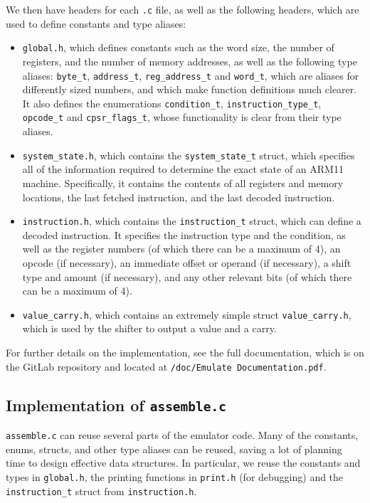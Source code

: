 \documentclass[10pt]{article}
\begin{document}
We then have headers for each \texttt{.c} file, as well as the following headers, which are used to define constants and type aliases:

\begin{itemize}
\item \texttt{global.h}, which defines constants such as the word size, the number of registers, and the number of memory addresses, as well as the following type aliases: \texttt{byte\_t}, \texttt{address\_t}, \texttt{reg\_address\_t} and \texttt{word\_t}, which are aliases for differently sized numbers, and which make function definitions much clearer. It also defines the enumerations \texttt{condition\_t}, \texttt{instruction\_type\_t}, \texttt{opcode\_t} and \texttt{cpsr\_flags\_t}, whose functionality is clear from their type aliases.
\item \texttt{system\_state.h}, which contains the \texttt{system\_state\_t} struct, which specifies all of the information required to determine the exact state of an ARM11 machine. Specifically, it contains the contents of all registers and memory locations, the last fetched instruction, and the last decoded instruction.
\item \texttt{instruction.h}, which contains the \texttt{instruction\_t} struct, which can define a decoded instruction. It specifies the instruction type and the condition, as well as the register numbers (of which there can be a maximum of 4), an opcode (if necessary), an immediate offset or operand (if necessary), a shift type and amount (if necessary), and any other relevant bits (of which there can be a maximum of 4).
\item \texttt{value\_carry.h}, which contains an extremely simple struct \texttt{value\_carry.h}, which is used by the shifter to output a value and a carry.
\end{itemize}

For further details on the implementation, see the full documentation, which is on the GitLab repository and located at \texttt{/doc/Emulate Documentation.pdf}.

\subsection{Implementation of \texttt{assemble.c}}

\texttt{assemble.c} can reuse several parts of the emulator code. Many of the constants, enums, structs, and other type aliases can be reused, saving a lot of planning time to design effective data structures. In particular, we reuse the constants and types in \texttt{global.h}, the printing functions in \texttt{print.h} (for debugging) and the \texttt{instruction\_t} struct from \texttt{instruction.h}.
\end{document}
